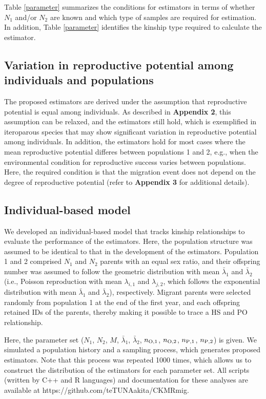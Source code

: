 \documentclass[12pt, English]{article}
\begin{document}
\begin{spacing}{1.9}
Table \ref{parameter} summarizes the conditions for estimators in terms of whether $N_1$ and/or $N_2$ are known and which type of samples are required for estimation. In addition, Table \ref{parameter} identifies the kinship type required to calculate the estimator. 

\subsection{Variation in reproductive potential among individuals and populations}

The proposed estimators are derived under the assumption that reproductive potential is equal among individuals. As described in {\bf Appendix 2}, this assumption can be relaxed, and the estimators still hold, which is exemplified in iteroparous species that may show significant variation in reproductive potential among individuals. In addition, the estimators hold for most cases where the mean reproductive potential differes between populations 1 and 2, e.g., when the environmental condition for reproductive success varies between populations. Here, the required condition is that the migration event does not depend on the degree of reproductive potential (refer to {\bf Appendix 3} for additional details). 

\subsection{Individual-based model}

We developed an individual-based model that tracks kinship relationships to evaluate the performance of the estimators. Here, the population structure was assumed to be identical to that in the development of the estimators. Population 1 and 2 comprised $N_1$ and $N_2$ parents with an equal sex ratio, and their offspring number was assumed to follow the geometric distribution with mean ${\bar \lambda_1}$ and ${\bar \lambda_2}$ (i.e., Poisson reproduction with mean $\lambda_{i,1}$ and $\lambda_{j,2}$, which follows the exponential distribution with mean ${\bar \lambda_1}$ and ${\bar \lambda_2}$), respectively. Migrant parents were selected randomly from population 1 at the end of the first year, and each offspring retained IDs of the parents, thereby making it possible to trace a HS and PO relationship.

Here, the parameter set ($N_1$, $N_2$, $M$, ${\bar \lambda_1}$, ${\bar \lambda_2}$, $n_{\rm O,1}$, $n_{\rm O,2}$, $n_{\rm P,1}$, $n_{\rm P,2}$) is given. We simulated a population history and a sampling process, which generates proposed estimators. Note that this process was repeated 1000 times, which allows us to construct the distribution of the estimators for each parameter set. All scripts (written by C{++} and R languages) and documentation for these analyses are available at https://github.com/teTUNAakita/CKMRmig.


\end{spacing}
\end{document}
